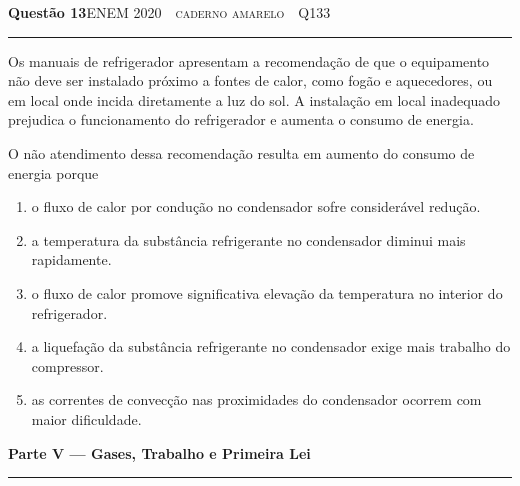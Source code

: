 \documentclass[11pt,a4paper]{article}
\newcommand{\fonte}[1]{{\small\scshape\color{grafite}#1}}
\newenvironment{questao}[2]{%
  \needspace{6\baselineskip}
  \par\addvspace{1.6em}
  {\large\bfseries\color{vinho}Quest\~ao #1}\hfill #2\\[-0.55em]
  {\color{black!25}\rule{\linewidth}{0.4pt}}
  \par\nobreak\smallskip
}{\par\addvspace{0.4em}}
\newcommand{\parte}[1]{%
  \needspace{7\baselineskip}
  \vspace{1.8em}
  {\Large\bfseries #1}\\[-0.55em]
  {\color{black!30}\rule{\linewidth}{0.5pt}}
  \par\nobreak\smallskip
}
\begin{document}
\begin{questao}{13}{\fonte{ENEM 2020 \,\textperiodcentered\, caderno amarelo \,\textperiodcentered\, Q133}}
Os manuais de refrigerador apresentam a recomenda\c{c}\~ao de que o
equipamento n\~ao deve ser instalado pr\'oximo a fontes de calor, como
fog\~ao e aquecedores, ou em local onde incida diretamente a luz do sol. A
instala\c{c}\~ao em local inadequado prejudica o funcionamento do
refrigerador e aumenta o consumo de energia.

O n\~ao atendimento dessa recomenda\c{c}\~ao resulta em aumento do consumo de
energia porque
\begin{enumerate}
  \item o fluxo de calor por condu\c{c}\~ao no condensador sofre
        consider\'avel redu\c{c}\~ao.
  \item a temperatura da subst\^ancia refrigerante no condensador diminui
        mais rapidamente.
  \item o fluxo de calor promove significativa eleva\c{c}\~ao da temperatura
        no interior do refrigerador.
  \item a liquefa\c{c}\~ao da subst\^ancia refrigerante no condensador exige
        mais trabalho do compressor.
  \item as correntes de convec\c{c}\~ao nas proximidades do condensador
        ocorrem com maior dificuldade.
\end{enumerate}
\end{questao}

\parte{Parte V --- Gases, Trabalho e Primeira Lei}
\end{document}

